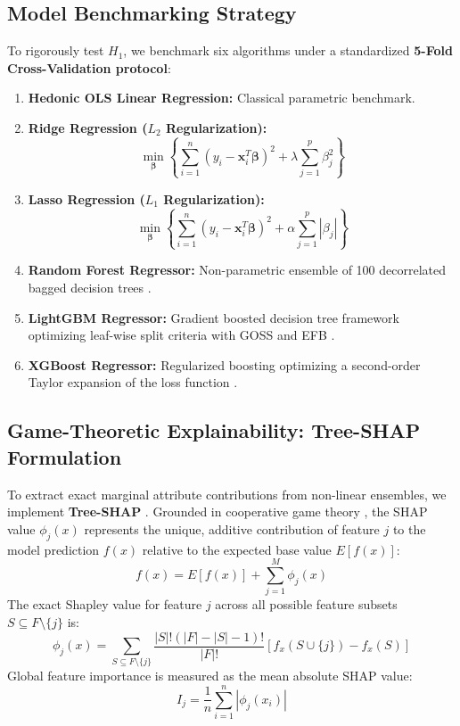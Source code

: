 \documentclass[11pt,a4paper]{article}
\begin{document}
\subsection{Model Benchmarking Strategy}
To rigorously test $H_1$, we benchmark six algorithms under a standardized \textbf{5-Fold Cross-Validation protocol}:
\begin{enumerate}[leftmargin=*]
    \item \textbf{Hedonic OLS Linear Regression:} Classical parametric benchmark.
    \item \textbf{Ridge Regression ($L_2$ Regularization):}
    \begin{equation}
    \min_{\boldsymbol{\beta}} \left\{ \sum_{i=1}^n \left(y_i - \mathbf{x}_i^T\boldsymbol{\beta}\right)^2 + \lambda \sum_{j=1}^p \beta_j^2 \right\}
    \end{equation}
    \item \textbf{Lasso Regression ($L_1$ Regularization):}
    \begin{equation}
    \min_{\boldsymbol{\beta}} \left\{ \sum_{i=1}^n \left(y_i - \mathbf{x}_i^T\boldsymbol{\beta}\right)^2 + \alpha \sum_{j=1}^p |\beta_j| \right\}
    \end{equation}
    \item \textbf{Random Forest Regressor:} Non-parametric ensemble of 100 decorrelated bagged decision trees \citep{breiman2001}.
    \item \textbf{LightGBM Regressor:} Gradient boosted decision tree framework optimizing leaf-wise split criteria with GOSS and EFB \citep{ke2017}.
    \item \textbf{XGBoost Regressor:} Regularized boosting optimizing a second-order Taylor expansion of the loss function \citep{chen2016}.
\end{enumerate}

\subsection{Game-Theoretic Explainability: Tree-SHAP Formulation}
To extract exact marginal attribute contributions from non-linear ensembles, we implement \textbf{Tree-SHAP} \citep{lundberg2017}. Grounded in cooperative game theory \citep{shapley1953}, the SHAP value $\phi_j(x)$ represents the unique, additive contribution of feature $j$ to the model prediction $f(x)$ relative to the expected base value $E[f(x)]$:
\begin{equation}
f(x) = E[f(x)] + \sum_{j=1}^M \phi_j(x)
\end{equation}
The exact Shapley value for feature $j$ across all possible feature subsets $S \subseteq F \setminus \{j\}$ is:
\begin{equation}
\phi_j(x) = \sum_{S \subseteq F \setminus \{j\}} \frac{|S|!(|F| - |S| - 1)!}{|F|!} \left[ f_x(S \cup \{j\}) - f_x(S) \right]
\end{equation}
Global feature importance is measured as the mean absolute SHAP value:
\begin{equation}
I_j = \frac{1}{n} \sum_{i=1}^n |\phi_j(x_i)|
\end{equation}
\end{document}
